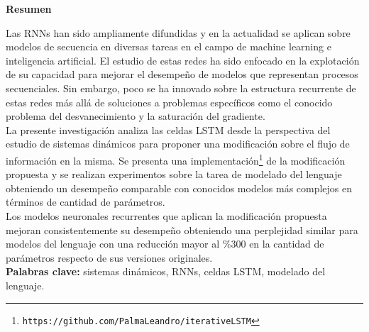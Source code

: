 \documentclass{article}
\begin{document}
	\pagebreak
	\vspace*{\fill}
	
	\begin{center}
		\Large\textbf{Resumen}
		\quad\linebreak
		
		
		\normalsize
	\end{center}	
	\normalsize
	
	Las RNNs han sido ampliamente difundidas y en la actualidad se aplican sobre modelos de secuencia en diversas tareas en el campo de machine learning e inteligencia artificial. El estudio de estas redes ha sido enfocado en la explotación de su capacidad para mejorar el desempeño de modelos que representan procesos secuenciales. Sin embargo, poco se ha innovado sobre la estructura recurrente de estas redes más allá de soluciones a problemas específicos como el conocido problema del desvanecimiento y la saturación del gradiente.\\
	La presente investigación analiza las celdas LSTM desde la perspectiva del estudio de sistemas dinámicos para proponer una modificación sobre el flujo de información en la misma. Se presenta una implementación\footnote{\texttt{https://github.com/PalmaLeandro/iterativeLSTM}\label{footnote1}} de la modificación propuesta y se realizan experimentos sobre la tarea de modelado del lenguaje obteniendo un desempeño comparable con conocidos modelos más complejos en términos de cantidad de parámetros.\\
	Los modelos neuronales recurrentes que aplican la modificación propuesta mejoran consistentemente su desempeño obteniendo una perplejidad similar para modelos del lenguaje con una reducción mayor al \%300 en la cantidad de parámetros respecto de sus versiones originales.\\
	\textbf{Palabras clave:} sistemas dinámicos, RNNs, celdas LSTM, modelado del lenguaje.\\
	
\end{document}
